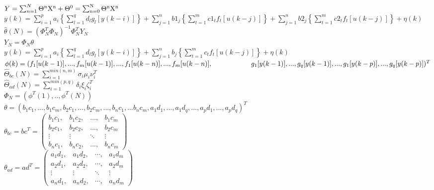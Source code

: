 \documentclass[12pt,a4paper]{report}
\author{Shi Qiongxue}
\begin{document}
$Y=\sum_{n=1}^N\Theta^n\rm X^n + \Theta^0 = \sum_{n=0}^N\Theta^n\rm X^n $\\

$y(k) =\sum\limits_{i=1}^p a_i\left \{  \sum\limits_{l=1}^qd_lg_l\left [ y(k-i) \right ]\right \}+\sum\limits_{j=1}^n b1_j\left \{  \sum\limits_{t=1}^mc1_tf_t\left [ u(k-j) \right ]\right \}+\sum\limits_{j=1}^n b2_j\left \{  \sum\limits_{t=1}^mc2_tf_t\left [ u(k-j) \right ]\right \} + \eta (k) $\\

$\hat{\theta }(N)=(\Phi_{N}^T\Phi_{N})^{-1}\Phi_{N}^TY_N$\\

$Y_N=\Phi _N\theta $\\

$y(k)= \sum_{i=1}^{p}a_i\left \{ \sum_{l=1}^{q}d_lg_l\left [ y(k-i) \right ] \right \}+\sum_{j=1}^{n}b_j\left \{ \sum_{t=1}^{m}c_tf_t\left [ u(k-j) \right ] \right \}+\eta (k)$\\

$\phi(k) =(f_1[u(k-1)],...,f_m[u(k-1)],...,f_1[u(k-n)],...,f_m[u(k-n)],\\ \text{\hspace{2cm}} g_1[y(k-1)],..., g_q[y(k-1)], ...,g_1[y(k-p)],...,g_q[y(k-p)])^T$\\

$\hat{\Theta }_{bc}(N)=\sum_{i=1}^{min(n,m)}\sigma _i\mu _i\nu _i^T$\\

$\hat{\Theta }_{ad}(N)=\sum_{i=1}^{min(p,q)}\delta  _i\xi  _i\zeta  _i^T$\\

$\Phi _N=(\phi ^T(1),..,\phi ^T(N))$\\

$\theta =(b_1c_1,...,b_1c_m,b_2c_1,...,b_2c_m,...,b_nc_1,...b_nc_m,a_1d_1,...,a_1d_q,...,a_pd_1,...,a_pd_q)^T$\\

$\theta_{bc}=bc^T=\begin{pmatrix}
b_1c_1, & b_1c_2, & ..., & b_1c_m\\ 
b_2c_1, & b_2c_2, & ..., & b_2c_m\\ 
 \vdots &  \vdots & \ddots   &\vdots  \\ 
b_nc_1, & b_nc_2, & ..., & b_nc_m
\end{pmatrix}$\\





$\theta_{ad}=ad^T=\begin{pmatrix}
a_1d_1, & a_1d_2, & \cdots , & a_1d_m\\ 
a_2d_1, & a_2d_2, & \cdots, & a_2d_m\\ 
 \vdots &  \vdots & \ddots   &\vdots  \\ 
a_nd_1, & a_nd_2, & \cdots, & a_nd_m
\end{pmatrix}$\\
\end{document}
